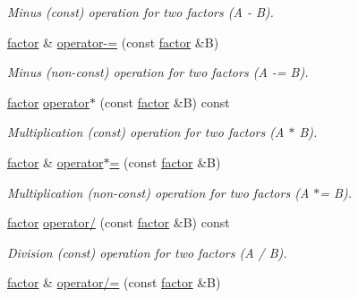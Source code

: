 \begin{DoxyCompactItemize}
\begin{DoxyCompactList}\small\item\em Minus (const) operation for two factors (A -\/ B). \end{DoxyCompactList}\item 
\hypertarget{classmerlin_1_1factor_a10de91f232933d6631760cf49e2a166b}{}\hyperlink{classmerlin_1_1factor}{factor} \& \hyperlink{classmerlin_1_1factor_a10de91f232933d6631760cf49e2a166b}{operator-\/=} (const \hyperlink{classmerlin_1_1factor}{factor} \&B)\label{classmerlin_1_1factor_a10de91f232933d6631760cf49e2a166b}

\begin{DoxyCompactList}\small\item\em Minus (non-\/const) operation for two factors (A -\/= B). \end{DoxyCompactList}\item 
\hypertarget{classmerlin_1_1factor_aeea27e3b1a15d46577da00027302e635}{}\hyperlink{classmerlin_1_1factor}{factor} \hyperlink{classmerlin_1_1factor_aeea27e3b1a15d46577da00027302e635}{operator$\ast$} (const \hyperlink{classmerlin_1_1factor}{factor} \&B) const \label{classmerlin_1_1factor_aeea27e3b1a15d46577da00027302e635}

\begin{DoxyCompactList}\small\item\em Multiplication (const) operation for two factors (A $\ast$ B). \end{DoxyCompactList}\item 
\hypertarget{classmerlin_1_1factor_af2a5efa9f529f8909d7114741a0d2a9e}{}\hyperlink{classmerlin_1_1factor}{factor} \& \hyperlink{classmerlin_1_1factor_af2a5efa9f529f8909d7114741a0d2a9e}{operator$\ast$=} (const \hyperlink{classmerlin_1_1factor}{factor} \&B)\label{classmerlin_1_1factor_af2a5efa9f529f8909d7114741a0d2a9e}

\begin{DoxyCompactList}\small\item\em Multiplication (non-\/const) operation for two factors (A $\ast$= B). \end{DoxyCompactList}\item 
\hypertarget{classmerlin_1_1factor_a2e9e4fc69ae5f7dd8a61e54f8aaabb52}{}\hyperlink{classmerlin_1_1factor}{factor} \hyperlink{classmerlin_1_1factor_a2e9e4fc69ae5f7dd8a61e54f8aaabb52}{operator/} (const \hyperlink{classmerlin_1_1factor}{factor} \&B) const \label{classmerlin_1_1factor_a2e9e4fc69ae5f7dd8a61e54f8aaabb52}

\begin{DoxyCompactList}\small\item\em Division (const) operation for two factors (A / B). \end{DoxyCompactList}\item 
\hypertarget{classmerlin_1_1factor_a61b3b5a5f8107f5ac154c3630dc2ef1c}{}\hyperlink{classmerlin_1_1factor}{factor} \& \hyperlink{classmerlin_1_1factor_a61b3b5a5f8107f5ac154c3630dc2ef1c}{operator/=} (const \hyperlink{classmerlin_1_1factor}{factor} \&B)\label{classmerlin_1_1factor_a61b3b5a5f8107f5ac154c3630dc2ef1c}


\end{DoxyCompactItemize}
